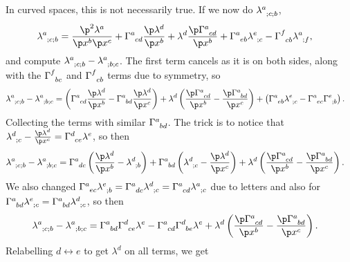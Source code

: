 \documentclass[a4paper, 11pt, normalem]{report}
\begin{document}
In curved spaces, this is not necessarily true. 
If we now do $\tensor{\lambda}{^a_{;c;b}}$,
\begin{align}
    \tensor{\lambda}{^a_{;c;b}} &= \frac{\p^2\lambda^a}{\p x^b\p x^c} + \tensor{\Gamma}{^a_{cd}}\frac{\p\lambda^d}{\p x^b} + \lambda^d\frac{\p\tensor{\Gamma}{^a_{cd}}}{\p x^b} + \tensor{\Gamma}{^a_{eb}}\tensor{\lambda}{^e_{;c}} - \tensor{\Gamma}{^f_{cb}}\tensor{\lambda}{^a_{;f}},
\end{align}
and compute $\tensor{\lambda}{^a_{;c;b}}-\tensor{\lambda}{^a_{;b;c}}$.
The first term cancels as it is on both sides, along with the $\tensor{\Gamma}{^f_{bc}}$ and $\tensor{\Gamma}{^f_{cb}}$ terms due to symmetry, so
\begin{align}
    \tensor{\lambda}{^a_{;c;b}}-\tensor{\lambda}{^a_{;b;c}} &= \left(\tensor{\Gamma}{^a_{cd}}\frac{\p\lambda^d}{\p x^b} - \tensor{\Gamma}{^a_{bd}}\frac{\p\lambda^d}{\p x^c}\right) + \lambda^d\left(\frac{\p\tensor{\Gamma}{^a_{cd}}}{\p x^b} - \frac{\p\tensor{\Gamma}{^a_{bd}}}{\p x^c}\right) + \left(\tensor{\Gamma}{^a_{eb}}\tensor{\lambda}{^e_{;c}}-\tensor{\Gamma}{^a_{ec}}\tensor{\Gamma}{^e_{;b}}\right).
\end{align}
Collecting the terms with similar $\tensor{\Gamma}{^a_{bd}}$. 
The trick is to notice that $\tensor{\lambda}{^d_{;c}}-\frac{\p\lambda^d}{\p x^c} = \tensor{\Gamma}{^d_{ce}}\lambda^e$, so then
\begin{align}
    \tensor{\lambda}{^a_{;c;b}} - \tensor{\lambda}{^a_{;b;c}} &= \tensor{\Gamma}{^a_{dc}}\left(\frac{\p\lambda^d}{\p x^b}-\tensor{\lambda}{^d_{;b}}\right) + \tensor{\Gamma}{^a_{bd}}\left(\tensor{\lambda}{^d_{;c}}-\frac{\p\lambda^d}{\p x^c}\right) + \lambda^d\left(\frac{\p\tensor{\Gamma}{^a_{cd}}}{\p x^b} - \frac{\p\tensor{\Gamma}{^a_{bd}}}{\p x^c}\right).
\end{align}
We also changed $\tensor{\Gamma}{^a_{ec}}\tensor{\lambda}{^e_{;b}} = \tensor{\Gamma}{^a_{dc}}\tensor{\lambda}{^d_{;c}} = \tensor{\Gamma}{^a_{cd}}\tensor{\lambda}{^a_{;c}}$ due to letters and also for $\tensor{\Gamma}{^a_{bd}}\tensor{\lambda}{^e_{;c}} = \tensor{\Gamma}{^a_{bd}}\tensor{\lambda}{^d_{;c}}$, so then
\begin{align}
    \tensor{\lambda}{^a_{;c;b}} - \tensor{\lambda}{^a_{;b;c}} &= \tensor{\Gamma}{^a_{bd}}\tensor{\Gamma}{^d_{ce}}\lambda^e - \tensor{\Gamma}{^a_{cd}}\tensor{\Gamma}{^d_{be}}\lambda^e + \lambda^d\left(\frac{\p\tensor{\Gamma}{^a_{cd}}}{\p x^b} - \frac{\p\tensor{\Gamma}{^a_{bd}}}{\p x^c}\right).
\end{align}
Relabelling $d\leftrightarrow e$ to get $\lambda^d$ on all terms, we get
\end{document}
